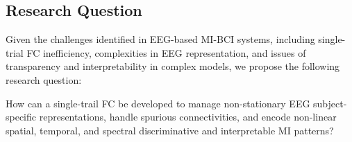 \subsection{Research Question}

Given the challenges identified in EEG-based MI-BCI systems, including single-trial FC inefficiency, complexities in EEG representation, and issues of transparency and interpretability in complex models, we propose the following research question:

How can a single-trail FC be developed to manage non-stationary EEG subject-specific representations, handle spurious connectivities, and encode non-linear spatial, temporal, and spectral discriminative and interpretable MI patterns?